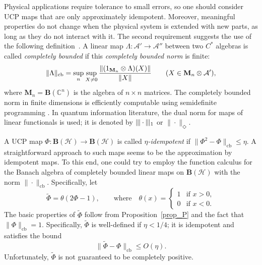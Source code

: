 \documentclass[12pt]{article}
\newcommand{\CC}{\mathbb{C}}
\newcommand{\calA}{\mathcal{A}}
\newcommand{\calH}{\mathcal{H}}
\newcommand{\ts}{\mkern1mu}
\newcommand{\cb}{\mathrm{cb}}
\newcommand{\Bo}{\mathbf{B}}
\newcommand{\wt}{\widetilde}
\newcommand*{\Ma}[1]{\mathbf{M}_{#1}}
\renewcommand{\le}{\leqslant}
\newtheorem[definition]{Definition}[Theorem]{Definition}
\newtheorem[remark]{Example}[Theorem]{Example}
\newtheorem[remark]{Remark}[Theorem]{Remark}
\newtheorem[remark]{Question}[Theorem]{Open question}
\newtheorem*[definition]{definition}{Definition}
\newtheorem*[remark]{example}{Example}
\newtheorem*[remark]{remark}{Remark}
\newtheorem*[remark]{question}{Open question}
\numberwithin{equation}{section}
\begin{document}
Physical applications require tolerance to small errors, so one should consider UCP maps that are only approximately idempotent. Moreover, meaningful properties do not change when the physical system is extended with new parts, as long as they do not interact with it. The second requirement suggests the use of the following definition~\cite{Paulsen}. A linear map $\Lambda\colon\calA'\to\calA''$ between two $C^*$ algebras is called \emph{completely bounded} if this \emph{completely bounded norm} is finite:
\begin{equation}
\|\Lambda\|_\cb=\sup_{n}\ts\sup_{X\not=0}
\frac{\|(1_{\Ma{n}}\otimes\Lambda)(X)\|}{\|X\|}\qquad
(X\in\Ma{n}\otimes\calA'),
\end{equation}
where $\Ma{n}=\Bo(\CC^n)$ is the algebra of $n\times n$ matrices. The completely bounded norm in finite dimensions is efficiently computable using semidefinite programming \cite[Chapter~3]{Watrous}. In quantum information literature, the dual norm for maps of linear functionals is used; it is denoted by $|\kern-0.6pt|\kern-0.6pt|\cdot|\kern-0.6pt|\kern-0.6pt|_1$ or $\|\cdot\|_{\Diamond}$.

A UCP map $\Phi\colon\Bo(\calH)\to\Bo(\calH)$ is called \emph{$\eta$-idempotent} if $\|\Phi^2-\Phi\|_\cb\le\eta$. A straightforward approach to such maps seems to be the approximation by idempotent maps. To this end, one could try to employ the function calculus for the Banach algebra of completely bounded linear maps on $\Bo(\calH)$ with the norm $\|\cdot\|_\cb$. Specifically, let\vspace{-3pt}
\begin{equation}
\wt{\Phi}=\theta(2\Phi-1),\qquad \text{where}\quad
\theta(x)=\begin{cases}1 & \text{if } x>0,\\ 0 & \text{if } x<0.\end{cases}
\end{equation}
The basic properties of $\wt{\Phi}$ follow from Proposition~\ref{prop_P} and the fact that $\|\Phi\|_\cb=1$. Specifically, $\wt{\Phi}$ is well-defined if $\eta<1/4$; it is idempotent and satisfies the bound
\begin{equation}
\|\wt{\Phi}-\Phi\|_\cb\le O(\eta).
\end{equation}
Unfortunately, $\wt{\Phi}$ is not guaranteed to be completely positive.
\end{document}
